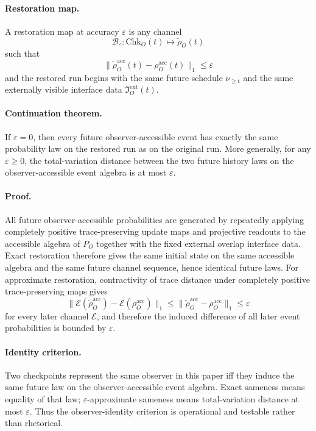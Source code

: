 \documentclass[11pt]{article}
\begin{document}
\paragraph{Restoration map.}
A restoration map at accuracy $\varepsilon$ is any channel
\begin{equation}
\mathcal B_\varepsilon:\mathrm{Chk}_O(t)\longmapsto \widetilde \rho_O(t)
\end{equation}
such that
\begin{equation}
\bigl\|
\widetilde \rho_O^{\mathrm{acc}}(t)-\rho_O^{\mathrm{acc}}(t)
\bigr\|_1
\le \varepsilon
\end{equation}
and the restored run begins with the same future schedule $\nu_{\ge t}$ and the same externally
visible interface data $\mathfrak I_O^{\mathrm{ext}}(t)$.

\paragraph{Continuation theorem.}
If $\varepsilon=0$, then every future observer-accessible event has exactly the same probability
law on the restored run as on the original run. More generally, for any $\varepsilon\ge 0$, the
total-variation distance between the two future history laws on the observer-accessible event
algebra is at most $\varepsilon$.

\paragraph{Proof.}
All future observer-accessible probabilities are generated by repeatedly applying completely
positive trace-preserving update maps and projective readouts to the accessible algebra of
$P_O$ together with the fixed external overlap interface data. Exact restoration therefore gives
the same initial state on the same accessible algebra and the same future channel sequence,
hence identical future laws. For approximate restoration, contractivity of trace distance under
completely positive trace-preserving maps gives
\begin{equation}
\bigl\|
\mathcal E(\widetilde \rho_O^{\mathrm{acc}})-\mathcal E(\rho_O^{\mathrm{acc}})
\bigr\|_1
\le
\bigl\|
\widetilde \rho_O^{\mathrm{acc}}-\rho_O^{\mathrm{acc}}
\bigr\|_1
\le
\varepsilon
\end{equation}
for every later channel $\mathcal E$, and therefore the induced difference of all later event
probabilities is bounded by $\varepsilon$.

\paragraph{Identity criterion.}
Two checkpoints represent the same observer in this paper iff they induce the same
future law on the observer-accessible event algebra. Exact sameness means equality of that law;
\(\varepsilon\)-approximate sameness means total-variation distance at most \(\varepsilon\).
Thus the observer-identity criterion is operational and testable rather than rhetorical.
\end{document}
